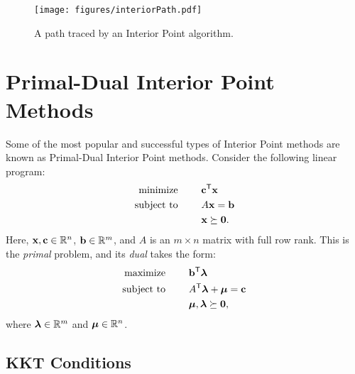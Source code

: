 \begin{figure}
\centering
\texttt{[image: figures/interiorPath.pdf]}
\caption{A path traced by an Interior Point algorithm.}
\label{fig:intPath}
\end{figure}

\section*{Primal-Dual Interior Point Methods} %
Some of the most popular and successful types of Interior Point methods are known as Primal-Dual Interior Point methods.
Consider the following linear program:
\begin{align*}
\text{minimize }\qquad &\mathbf{c}^{\mathsf T} \mathbf{x}\\
\text{subject to }\qquad &A\mathbf{x} = \mathbf{b}\\
&\mathbf{x} \succeq \mathbf{0}.
\end{align*}
Here, $\mathbf{x}, \mathbf{c} \in \mathbb{R}^n$, $\mathbf{b} \in \mathbb{R}^m$, and $A$ is an $m \times n$ matrix with full row rank.
This is the \emph{primal} problem, and its \emph{dual} takes the form:
\begin{align*}
\text{maximize }\qquad &\mathbf{b}^{\mathsf T} \boldsymbol{\lambda}\\
\text{subject to }\qquad &A^{\mathsf T} \boldsymbol{\lambda} + \boldsymbol{\mu} = \mathbf{c}\\
&\boldsymbol{\mu},\boldsymbol{\lambda} \succeq \mathbf{0},
\end{align*}
where $\boldsymbol{\lambda} \in \mathbb{R}^m$ and $\boldsymbol{\mu} \in \mathbb{R}^n$.

\subsection*{KKT Conditions}

